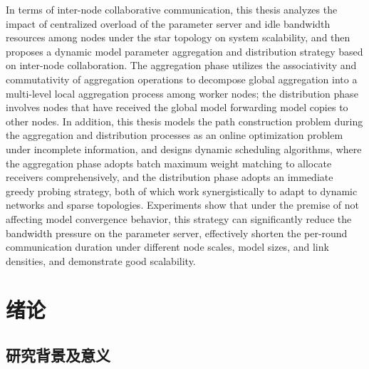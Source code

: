 \documentclass[master, vlined]{DissertUESTC}
\begin{document}
	In terms of inter-node collaborative communication, this thesis analyzes the impact of centralized overload of the parameter server and idle bandwidth resources among nodes under the star topology on system scalability, and then proposes a dynamic model parameter aggregation and distribution strategy based on inter-node collaboration. The aggregation phase utilizes the associativity and commutativity of aggregation operations to decompose global aggregation into a multi-level local aggregation process among worker nodes; the distribution phase involves nodes that have received the global model forwarding model copies to other nodes. In addition, this thesis models the path construction problem during the aggregation and distribution processes as an online optimization problem under incomplete information, and designs dynamic scheduling algorithms, where the aggregation phase adopts batch maximum weight matching to allocate receivers comprehensively, and the distribution phase adopts an immediate greedy probing strategy, both of which work synergistically to adapt to dynamic networks and sparse topologies. Experiments show that under the premise of not affecting model convergence behavior, this strategy can significantly reduce the bandwidth pressure on the parameter server, effectively shorten the per-round communication duration under different node scales, model sizes, and link densities, and demonstrate good scalability.


	\tableofcontents  %

	\listoffigures  %

	\listoftables  %

	\printnomenclature

	\chapter{绪论}

	\section{研究背景及意义}
\end{document}
